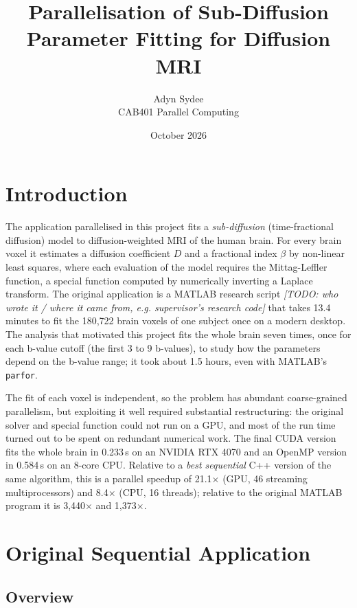 \documentclass[11pt]{article}
\title{Parallelisation of Sub-Diffusion Parameter Fitting for Diffusion MRI}
\author{Adyn Sydee \\ CAB401 Parallel Computing}
\date{October 2026}
\begin{document}
\maketitle

\section{Introduction}

The application parallelised in this project fits a \emph{sub-diffusion} (time-fractional
diffusion) model to diffusion-weighted MRI of the human brain. For every brain voxel it
estimates a diffusion coefficient $D$ and a fractional index $\beta$ by non-linear least
squares, where each evaluation of the model requires the Mittag-Leffler function, a special
function computed by numerically inverting a Laplace transform. The original application is a
MATLAB research script \textit{[TODO: who wrote it / where it came from, e.g. supervisor's research code]}
that takes 13.4 minutes to fit the 180,722 brain voxels of one subject once on a modern desktop.
The analysis that motivated this project fits the whole brain seven times, once for each b-value
cutoff (the first 3 to 9 b-values), to study how the parameters depend on the b-value range;
it took about 1.5 hours, even with MATLAB's \texttt{parfor}.

The fit of each voxel is independent, so the problem has abundant coarse-grained parallelism,
but exploiting it well required substantial restructuring: the original solver and special
function could not run on a GPU, and most of the run time turned out to be spent on
redundant numerical work. The final CUDA version fits the whole brain in 0.233\,s on an
NVIDIA RTX 4070 and an OpenMP version in 0.584\,s on an 8-core CPU. Relative to a
\emph{best sequential} C++ version of the same algorithm, this is a parallel speedup of
21.1$\times$ (GPU, 46 streaming multiprocessors) and 8.4$\times$ (CPU, 16 threads); relative
to the original MATLAB program it is 3,440$\times$ and 1,373$\times$.

\section{Original Sequential Application}

\subsection{Overview}
\end{document}
